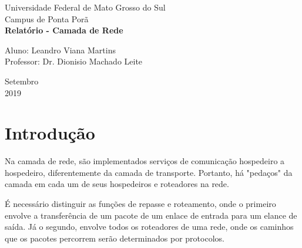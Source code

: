 \documentclass[a4paper, 12pt]{article}
\begin{document}

\begin{titlepage}
	\begin{center}
	

		\large{Universidade Federal de Mato Grosso do Sul}\\
		\large{Campus de Ponta Porã}\\ 
		\vspace{15pt}
        \vspace{95pt}
        \textbf{\LARGE{Relatório - Camada de Rede }}\\
		\vspace{3,5cm}
	\end{center}
	
	\begin{flushleft}
		\begin{tabbing}
			Aluno: Leandro Viana Martins\\
			Professor: Dr. Dionisio Machado Leite\\
	\end{tabbing}
 \end{flushleft}
	\vspace{1cm}
	
	\begin{center}
		\vspace{\fill}
			Setembro\\
            2019
	\end{center}
\end{titlepage}

\newpage
\section{Introdução}
Na camada de rede, são implementados serviços de comunicação hospedeiro a hospedeiro, diferentemente da camada de 
transporte. Portanto, há "pedaços" da camada em cada um de seus hospedeiros e roteadores na rede.

É necessário distinguir as funções de repasse e roteamento, onde o primeiro envolve a transferência de um pacote de um enlace
de entrada para um elance de saída. Já o segundo, envolve todos os roteadores de uma rede, onde os caminhos que os pacotes 
percorrem serão determinados por protocolos.
\end{document}
